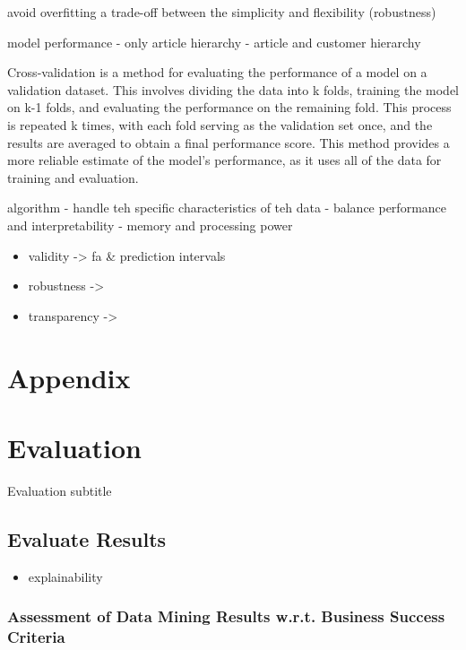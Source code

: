 \documentclass[
  american,
  10,
  a4paper,
]{book}
\providecommand{\tightlist}{%
  \setlength{\itemsep}{0pt}\setlength{\parskip}{0pt}}
\theoremstyle{definition}
\theoremstyle{remark}
\begin{document}
avoid overfitting a trade-off between the simplicity and flexibility
(robustness)

model performance - only article hierarchy - article and customer
hierarchy

Cross-validation is a method for evaluating the performance of a model
on a validation dataset. This involves dividing the data into k folds,
training the model on k-1 folds, and evaluating the performance on the
remaining fold. This process is repeated k times, with each fold serving
as the validation set once, and the results are averaged to obtain a
final performance score. This method provides a more reliable estimate
of the model's performance, as it uses all of the data for training and
evaluation.

algorithm - handle teh specific characteristics of teh data - balance
performance and interpretability - memory and processing power

\begin{itemize}
\tightlist
\item
  validity -\textgreater{} fa \& prediction intervals
\item
  robustness -\textgreater{}
\item
  transparency -\textgreater{}
\end{itemize}

\chapter*{Appendix}\label{appendix-1}


\chapter{Evaluation}\label{evaluation-1}

Evaluation subtitle

\hfill\break

\section{Evaluate Results}\label{evaluate-results}

\begin{itemize}
\tightlist
\item
  explainability
\end{itemize}

\subsection{Assessment of Data Mining Results w.r.t. Business Success
Criteria}\label{assessment-of-data-mining-results-w.r.t.-business-success-criteria}
\end{document}
